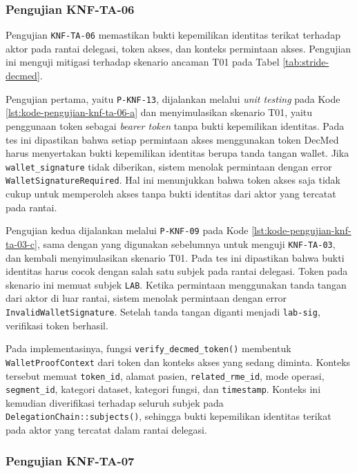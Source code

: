 \subsubsection{Pengujian KNF-TA-06}
\label{subsubsec:pengujian-knf-ta-06}

Pengujian \texttt{KNF-TA-06} memastikan bukti kepemilikan identitas terikat terhadap aktor pada rantai delegasi, token akses, dan konteks permintaan akses. Pengujian ini menguji mitigasi terhadap skenario ancaman T01 pada Tabel \ref{tab:stride-decmed}.

Pengujian pertama, yaitu \texttt{P-KNF-13}, dijalankan melalui \textit{unit testing} pada Kode \ref{lst:kode-pengujian-knf-ta-06-a} dan menyimulasikan skenario T01, yaitu penggunaan token sebagai \textit{bearer token} tanpa bukti kepemilikan identitas. Pada tes ini dipastikan bahwa setiap permintaan akses menggunakan token DecMed harus menyertakan bukti kepemilikan identitas berupa tanda tangan wallet. Jika \texttt{wallet\_signature} tidak diberikan, sistem menolak permintaan dengan error \texttt{WalletSignatureRequired}. Hal ini menunjukkan bahwa token akses saja tidak cukup untuk memperoleh akses tanpa bukti identitas dari aktor yang tercatat pada rantai.

Pengujian kedua dijalankan melalui \texttt{P-KNF-09} pada Kode \ref{lst:kode-pengujian-knf-ta-03-c}, sama dengan yang digunakan sebelumnya untuk menguji \texttt{KNF-TA-03}, dan kembali menyimulasikan skenario T01. Pada tes ini dipastikan bahwa bukti identitas harus cocok dengan salah satu subjek pada rantai delegasi. Token pada skenario ini memuat subjek \texttt{LAB}. Ketika permintaan menggunakan tanda tangan dari aktor di luar rantai, sistem menolak permintaan dengan error \texttt{InvalidWalletSignature}. Setelah tanda tangan diganti menjadi \texttt{lab-sig}, verifikasi token berhasil.

Pada implementasinya, fungsi \texttt{verify\_decmed\_token()} membentuk \texttt{WalletProofContext} dari token dan konteks akses yang sedang diminta. Konteks tersebut memuat \texttt{token\_id}, alamat pasien, \texttt{related\_rme\_id}, mode operasi, \texttt{segment\_id}, kategori dataset, kategori fungsi, dan \texttt{timestamp}. Konteks ini kemudian diverifikasi terhadap seluruh subjek pada \texttt{DelegationChain::subjects()}, sehingga bukti kepemilikan identitas terikat pada aktor yang tercatat dalam rantai delegasi.

\subsubsection{Pengujian KNF-TA-07}
\label{subsubsec:pengujian-knf-ta-07}

